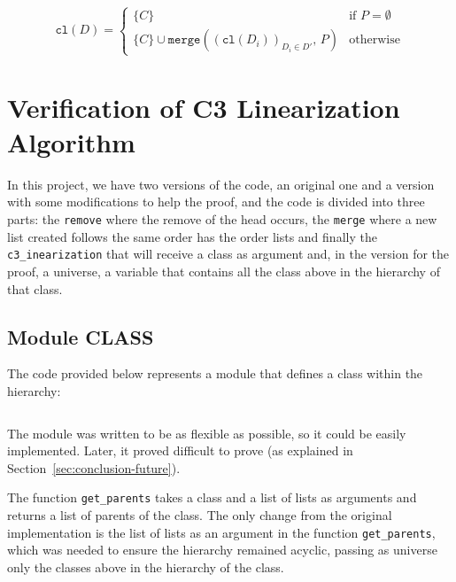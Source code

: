 \documentclass[runningheads]{llncs}
\newcommand*{\mer}{\texttt{merge}}
\begin{document}
\[
\texttt{cl}(D) =
\begin{cases}
\{C\} & \text{if } P = \emptyset \\
\{C\} \cup \mer\left( \left( \texttt{cl}(D_i) \right)_{D_i \in D'},\, P \right) & \text{otherwise}
\end{cases}
\]

\section{Verification of C3 Linearization Algorithm}

In this project, we have two versions of the code, an original one and a version with some modifications to help the proof,
 and the code is divided into three parts: the \texttt{remove} where the remove of the head occurs, 
 the \texttt{merge} where a new list created follows the same order has the order lists and finally the \texttt{c3\_inearization} that will receive a class as argument and,
  in the version for the proof, a universe, a variable that contains all the class above in the hierarchy of that class.

\subsection{Module CLASS}
\label{subsec:CLASS}

The code provided below represents a module that defines a class within the hierarchy:
\inputminted[firstline=4,lastline=22,fontsize=\small,linenos,xleftmargin=20pt]{ocaml}{../c3/cameleer/c3.ml} 
The module was written to be as flexible as possible, so it could be easily implemented.
Later, it proved difficult to prove (as explained in Section~\ref{sec:conclusion-future}).

The function \texttt{get\_parents} takes a class and a list of lists as arguments and returns a list of parents of the class.
The only change from the original implementation is the list of lists as an argument in the function 
\texttt{get\_parents}, which was needed to ensure the hierarchy remained acyclic,
 passing as universe only the classes above in the hierarchy of the class.
\end{document}
